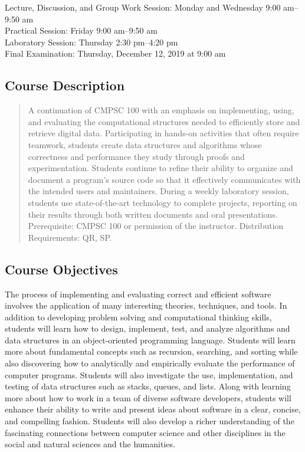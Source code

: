 \documentclass[11pt]{article}
\begin{document}
Lecture, Discussion, and Group Work Session: Monday and Wednesday 9:00 am--9:50 am \\
Practical Session: Friday 9:00 am--9:50 am \\
Laboratory Session: Thursday 2:30 pm--4:20 pm \\
Final Examination: Thursday, December 12, 2019 at 9:00 am

\subsection*{Course Description}

\begin{quote}

A continuation of CMPSC 100 with an emphasis on implementing, using, and
evaluating the computational structures needed to efficiently store and retrieve
digital data. Participating in hands-on activities that often require teamwork,
students create data structures and algorithms whose correctness and performance
they study through proofs and experimentation. Students continue to refine their
ability to organize and document a program's source code so that it effectively
communicates with the intended users and maintainers. During a weekly laboratory
session, students use state-of-the-art technology to complete projects,
reporting on their results through both written documents and oral
presentations. Prerequisite: CMPSC 100 or permission of the instructor.
Distribution Requirements: QR, SP.\@ \\

\end{quote}

\subsection*{Course Objectives}

The process of implementing and evaluating correct and efficient software
involves the application of many interesting theories, techniques, and tools. In
addition to developing problem solving and computational thinking skills, students
will learn how to design, implement, test, and analyze algorithms and data
structures in an object-oriented programming language. Students will learn more
about fundamental concepts such as recursion, searching, and sorting while also
discovering how to analytically and empirically evaluate the performance of
computer programs. Students will also investigate the use, implementation, and
testing of data structures such as stacks, queues, and lists. Along with
learning more about how to work in a team of diverse software developers,
students will enhance their ability to write and present ideas about software in
a clear, concise, and compelling fashion. Students will also develop a richer
understanding of the fascinating connections between computer science and other
disciplines in the social and natural sciences and the humanities.
\end{document}
